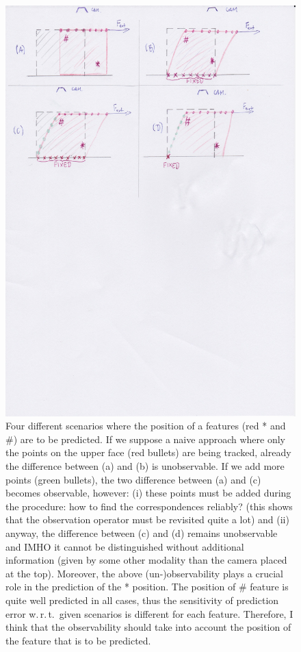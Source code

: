 \documentclass[paper=a4, fontsize=11pt]{article}
\def\wrt{w.\,r.\,t.}
\begin{document}
\begin{figure}
	\includegraphics[width=\textwidth]{figs/schemeObservations.pdf}
	\caption{Four different scenarios where the position of a features (red * and \#) are to be predicted. If we suppose a naive approach where only the points on the upper face (red bullets) are being tracked, already the difference between (a) and (b) is unobservable. If we add more points (green bullets), the two difference between (a) and (c) becomes observable, however: (i) these points must be added during the procedure: how to find the correspondences reliably? (this shows that the observation operator must be revisited quite a lot) and (ii) anyway, the difference between (c) and (d) remains unobservable and IMHO it cannot be distinguished without additional information (given by some other modality than the camera placed at the top). 		
		Moreover, the above (un-)observability plays a crucial role in the prediction of the * position. The position of \# feature is quite well predicted in all cases, thus the sensitivity of prediction error \wrt~given scenarios is different for each feature.  
	    Therefore, I think that the observability should take into account the position of the feature that is to be predicted. 		
		}		
	\label{f:scheme}
\end{figure}







\end{document}
